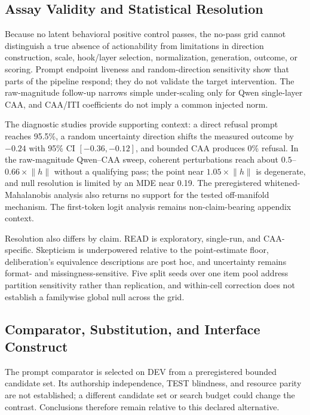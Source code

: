 \documentclass[manuscript,review,anonymous]{acmart}
\begin{document}
\subsection{Assay Validity and Statistical Resolution}\label{assay-validity-and-statistical-resolution}

Because no latent behavioral positive control passes, the no-pass grid cannot distinguish a true absence of actionability from limitations in direction construction, scale, hook/layer selection, normalization, generation, outcome, or scoring. {}%
Prompt endpoint liveness and random-direction sensitivity show that parts of the pipeline respond; they do not validate the target intervention. The raw-magnitude follow-up narrows simple under-scaling only for Qwen single-layer CAA, and CAA/ITI coefficients do not imply a common injected norm. {}%
{}%
{}%

The diagnostic studies provide supporting context: a direct refusal prompt reaches 95.5\%, a random uncertainty direction shifts the measured outcome by \(-0.24\) with 95\% CI \([-0.36,-0.12]\), and bounded CAA produces 0\% refusal. {}%
{}%
In the raw-magnitude Qwen--CAA sweep, coherent perturbations reach about \(0.5\)--\(0.66\times\lVert h\rVert\) without a qualifying pass; the point near \(1.05\times\lVert h\rVert\) is degenerate, and null resolution is limited by an MDE near 0.19. {}%
{}%
{}%
The preregistered whitened-Mahalanobis analysis also returns no support for the tested off-manifold mechanism. {}%
The first-token logit analysis remains non-claim-bearing appendix context.

Resolution also differs by claim. READ is exploratory, single-run, and CAA-specific. {}%
{}%
Skepticism is underpowered relative to the point-estimate floor, deliberation's equivalence descriptions are post hoc, and uncertainty remains format- and missingness-sensitive. {}%
{}%
{}%
{}%
Five split seeds over one item pool address partition sensitivity rather than replication, and within-cell correction does not establish a familywise global null across the grid. {}%
{}%

\subsection{Comparator, Substitution, and Interface Construct}\label{comparator-substitution-and-interface-construct}

The prompt comparator is selected on DEV from a preregistered bounded candidate set. Its authorship independence, TEST blindness, and resource parity are not established; a different candidate set or search budget could change the contrast. {}%
{}%
Conclusions therefore remain relative to this declared alternative.
\end{document}
